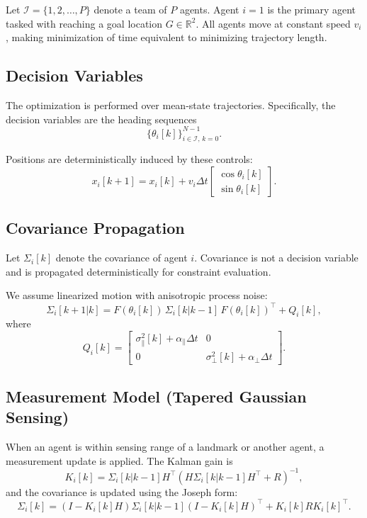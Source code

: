 
Let $\mathcal{I} = \{1,2,\dots,P\}$ denote a team of $P$ agents. Agent $i=1$ is the primary agent tasked with reaching a goal location $G \in \mathbb{R}^2$. All agents move at constant speed $v_i$, making minimization of time equivalent to minimizing trajectory length.

\subsection{Decision Variables}

The optimization is performed over mean-state trajectories. Specifically, the decision variables are the heading sequences
\[
\{\theta_i[k]\}_{i \in \mathcal{I},\, k=0}^{N-1}.
\]

Positions are deterministically induced by these controls:
\[
x_i[k+1] = x_i[k] + v_i \Delta t
\begin{bmatrix}
\cos \theta_i[k] \\
\sin \theta_i[k]
\end{bmatrix}.
\]

\subsection{Covariance Propagation}

Let $\Sigma_i[k]$ denote the covariance of agent $i$. Covariance is not a decision variable and is propagated deterministically for constraint evaluation.

We assume linearized motion with anisotropic process noise:
\[
\Sigma_i[k+1|k] = F(\theta_i[k])\,\Sigma_i[k|k-1]\,F(\theta_i[k])^\top + Q_i[k],
\]
where
\[
Q_i[k] =
\begin{bmatrix}
\sigma^2_{\parallel}[k] + \alpha_{\parallel}\Delta t & 0 \\
0 & \sigma^2_{\perp}[k] + \alpha_{\perp}\Delta t
\end{bmatrix}.
\]

\subsection{Measurement Model (Tapered Gaussian Sensing)}

When an agent is within sensing range of a landmark or another agent, a measurement update is applied. The Kalman gain is
\[
K_i[k] = \Sigma_i[k|k-1] H^\top \left(H \Sigma_i[k|k-1] H^\top + R\right)^{-1},
\]
and the covariance is updated using the Joseph form:
\[
\Sigma_i[k] = (I - K_i[k]H)\Sigma_i[k|k-1](I - K_i[k]H)^\top + K_i[k] R K_i[k]^\top.
\]

